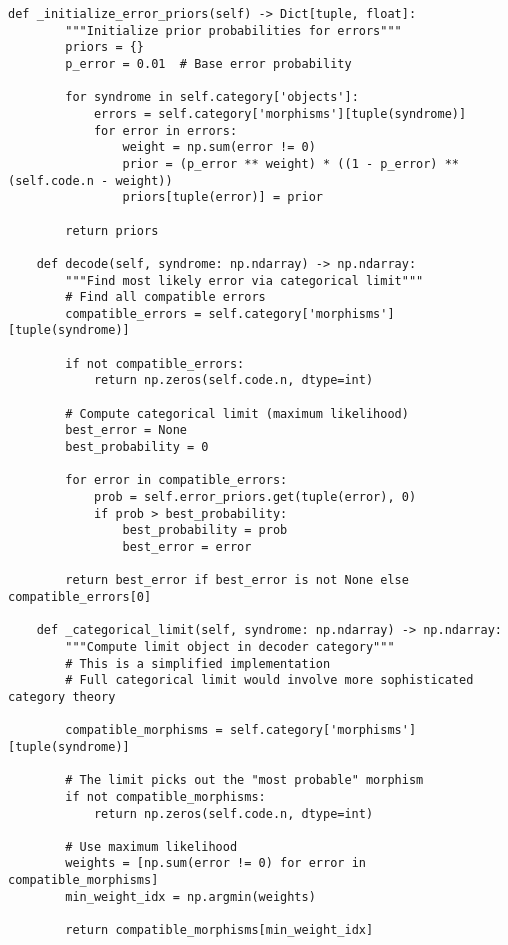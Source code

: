 \documentclass[12pt,a4paper]{article}
\begin{document}
\begin{lstlisting}[style=python,caption=Categorical decoder using limits]
    def _initialize_error_priors(self) -> Dict[tuple, float]:
        """Initialize prior probabilities for errors"""
        priors = {}
        p_error = 0.01  # Base error probability
        
        for syndrome in self.category['objects']:
            errors = self.category['morphisms'][tuple(syndrome)]
            for error in errors:
                weight = np.sum(error != 0)
                prior = (p_error ** weight) * ((1 - p_error) ** (self.code.n - weight))
                priors[tuple(error)] = prior
        
        return priors
    
    def decode(self, syndrome: np.ndarray) -> np.ndarray:
        """Find most likely error via categorical limit"""
        # Find all compatible errors
        compatible_errors = self.category['morphisms'][tuple(syndrome)]
        
        if not compatible_errors:
            return np.zeros(self.code.n, dtype=int)
        
        # Compute categorical limit (maximum likelihood)
        best_error = None
        best_probability = 0
        
        for error in compatible_errors:
            prob = self.error_priors.get(tuple(error), 0)
            if prob > best_probability:
                best_probability = prob
                best_error = error
        
        return best_error if best_error is not None else compatible_errors[0]
    
    def _categorical_limit(self, syndrome: np.ndarray) -> np.ndarray:
        """Compute limit object in decoder category"""
        # This is a simplified implementation
        # Full categorical limit would involve more sophisticated category theory
        
        compatible_morphisms = self.category['morphisms'][tuple(syndrome)]
        
        # The limit picks out the "most probable" morphism
        if not compatible_morphisms:
            return np.zeros(self.code.n, dtype=int)
        
        # Use maximum likelihood
        weights = [np.sum(error != 0) for error in compatible_morphisms]
        min_weight_idx = np.argmin(weights)
        
        return compatible_morphisms[min_weight_idx]
\end{lstlisting}
\end{document}
